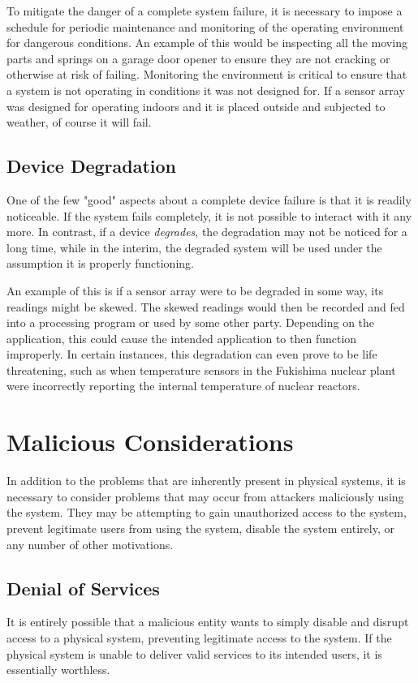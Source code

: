 To mitigate the danger of a complete system failure, it is necessary to impose a schedule for periodic maintenance and
monitoring of the operating environment for dangerous conditions. An example of this would be inspecting all the moving
parts and springs on a garage door opener to ensure they are not cracking or otherwise at risk of failing. 
Monitoring the environment is critical to ensure that a system is not operating in conditions it was not designed for. If a sensor
array was designed for operating indoors and it is placed outside and subjected to weather, of course it will fail.


\subsection{Device Degradation}
One of the few "good" aspects about a complete device failure is that it is readily noticeable. If the system fails completely,
it is not possible to interact with it any more. In contrast, if a device \textit{degrades}, the degradation may not be noticed
for a long time, while in the interim, the degraded system will be used under the assumption it is properly functioning.

An example of this is if a sensor array were to be degraded in some way, its readings might be skewed. The skewed readings
would then be recorded and fed into a processing program or used by some other party. Depending on the application, this
could cause the intended application to then function improperly. In certain instances, this degradation can even prove to be
life threatening, such as when temperature sensors in the Fukishima nuclear plant were incorrectly reporting the internal
temperature of nuclear reactors.~\cite{fukushima}

\section{Malicious Considerations}
In addition to the problems that are inherently present in physical systems, it is necessary to consider problems that may
occur from attackers maliciously using the system. They may be attempting to gain unauthorized access to the system,
prevent legitimate users from using the system, disable the system entirely, or any number of other motivations.

\subsection{Denial of Services}
It is entirely possible that a malicious entity wants to simply disable and disrupt access to a physical system, preventing legitimate access
to the system. If the physical system is unable to deliver valid services to its intended users, it is essentially worthless. 

